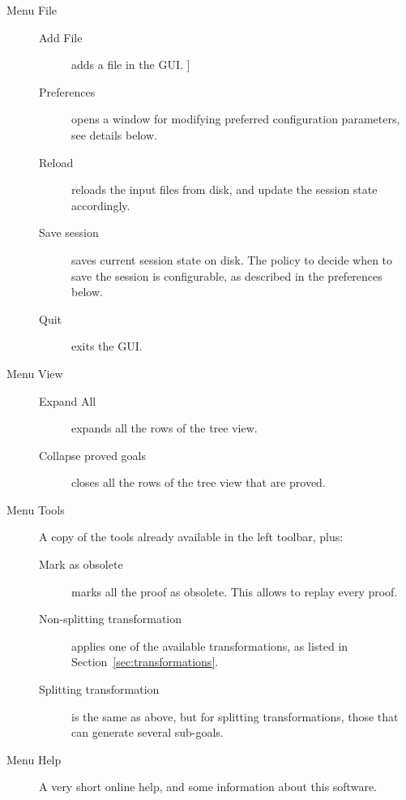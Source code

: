 \begin{description}
\item[Menu \textsf{File}]\emptyitem
\begin{description}
\item[Add File] adds a file in the GUI.
]\item[Preferences] opens a window for modifying preferred
  configuration parameters, see details below.
\item[Reload] reloads the input files from disk, and update the session state accordingly.
\item[Save session] saves current session state on disk. The policy to decide when to save the session is configurable, as described in the preferences below.
\item[Quit] exits the GUI.
\end{description}

\item[Menu \textsf{View}]\emptyitem
\begin{description}
\item[Expand All] expands all the rows of the tree view.
\item[Collapse proved goals] closes all the rows of the tree view
  that are proved.
\end{description}

\item[Menu \textsf{Tools}]
A copy of the tools already available in the left toolbar, plus:
\begin{description}
\item[Mark as obsolete] marks all the proof as
  obsolete.
  This allows to replay every proof.
\item[Non-splitting transformation] applies one of the available
  transformations, as listed in Section~\ref{sec:transformations}.
\item[Splitting transformation] is the same as above, but for
  splitting transformations, \ie those that can generate
  several sub-goals.
\end{description}

\item[Menu \textsf{Help}]
A very short online help, and some information about this software.
\end{description}

